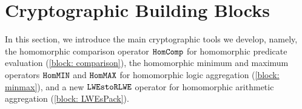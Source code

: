 \section{Cryptographic Building Blocks}\label{block}


In this section, 
we introduce the main cryptographic tools we develop,
namely, the homomorphic comparison operator $\texttt{HomComp}$ for
homomorphic predicate evaluation (\cref{block: comparison}), 
the homomorphic minimum and maximum operators 
${\texttt{HomMIN}}$ and ${\texttt{HomMAX}}$
for homomorphic logic aggregation (\cref{block: minmax}),
and a new $\texttt{LWEstoRLWE}$ operator for homomorphic arithmetic aggregation  
(\cref{block: LWEsPack}).








